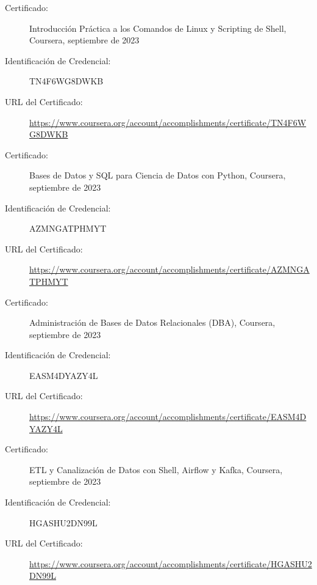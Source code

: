 \documentclass[a4paper,10pt]{article}
\begin{document}
\vspace{1pt} %

\begin{description}
    \item[Certificado:] Introducción Práctica a los Comandos de Linux y Scripting de Shell, Coursera, septiembre de 2023
    \item[Identificación de Credencial:] TN4F6WG8DWKB
    \item[URL del Certificado:] \url{https://www.coursera.org/account/accomplishments/certificate/TN4F6WG8DWKB}
\end{description}

\vspace{1pt} %

\begin{description}
    \item[Certificado:] Bases de Datos y SQL para Ciencia de Datos con Python, Coursera, septiembre de 2023
    \item[Identificación de Credencial:] AZMNGATPHMYT
    \item[URL del Certificado:] \url{https://www.coursera.org/account/accomplishments/certificate/AZMNGATPHMYT}
\end{description}

\vspace{1pt} %

\begin{description}
    \item[Certificado:] Administración de Bases de Datos Relacionales (DBA), Coursera, septiembre de 2023
    \item[Identificación de Credencial:] EASM4DYAZY4L
    \item[URL del Certificado:] \url{https://www.coursera.org/account/accomplishments/certificate/EASM4DYAZY4L}
\end{description}

\vspace{1pt} %

\begin{description}
    \item[Certificado:] ETL y Canalización de Datos con Shell, Airflow y Kafka, Coursera, septiembre de 2023
    \item[Identificación de Credencial:] HGASHU2DN99L
    \item[URL del Certificado:] \url{https://www.coursera.org/account/accomplishments/certificate/HGASHU2DN99L}
\end{description}
\vspace{1pt} %
\end{document}
